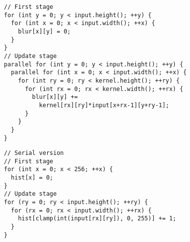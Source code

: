 \begin{lstlisting}[caption={Convolution blur kernel is easily parallelizable across \code{Var} $x$ adn $y$.}, label={lst:blur_loopness}]
// First stage
for (int y = 0; y < input.height(); ++y) {
  for (int x = 0; x < input.width(); ++x) {
    blur[x][y] = 0;
  }
}
// Update stage
parallel for (int y = 0; y < input.height(); ++y) {
  parallel for (int x = 0; x < input.width(); ++x) {
    for (int ry = 0; ry < kernel.height(); ++ry) {
      for (int rx = 0; rx < kernel.width(); ++rx) {
        blur[x][y] += 
          kernel[rx][ry]*input[x+rx-1][y+ry-1];
      }
    }
  }
} 
\end{lstlisting}

\begin{lstlisting}[caption={Histogram of an image is hard to parallelize since its update stage does not involve \code{Var}s.}, label={lst:histogram_loopness}]
// Serial version
// First stage
for (int x = 0; x < 256; ++x) {
  hist[x] = 0;
}
// Update stage
for (ry = 0; ry < input.height(); ++ry) {
  for (rx = 0; rx < input.width(); ++rx) {
    hist[clamp(int(input[rx][ry]), 0, 255)] += 1;
  }
}
\end{lstlisting}
